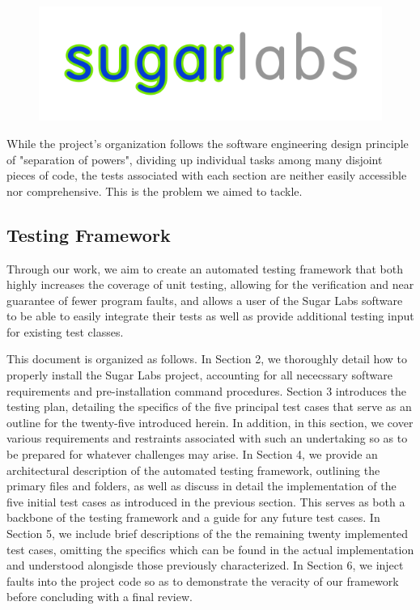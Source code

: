 \documentclass{article}
\begin{document}
\begin{figure}
\centering
\includegraphics[scale=0.5]{../imgs/Figure4.png}
\end{figure}

While the project's organization follows the software engineering design principle of "separation of powers", dividing up individual tasks among many disjoint pieces of code, the tests associated with each section are neither easily accessible nor comprehensive. This is the problem we aimed to tackle.
\subsection{Testing Framework}
Through our work, we aim to create an automated testing framework that both highly increases the coverage of unit testing, allowing for the verification and near guarantee of fewer program faults, and allows a user of the Sugar Labs software to be able to easily integrate their tests as well as provide additional testing input for existing test classes.

This document is organized as follows. In Section 2, we thoroughly detail how to properly install the Sugar Labs project, accounting for all nececssary software requirements and pre-installation command procedures. Section 3 introduces the testing plan, detailing the specifics of the five principal test cases that serve as an outline for the twenty-five introduced herein. In addition, in this section, we cover various requirements and restraints associated with such an undertaking so as to be prepared for whatever challenges may arise. In Section 4, we provide an architectural description of the automated testing framework, outlining the primary files and folders, as well as discuss in detail the implementation of the five initial test cases as introduced in the previous section. This serves as both a backbone of the testing framework and a guide for any future test cases. In Section 5, we include brief descriptions of the the remaining twenty implemented test cases, omitting the specifics which can be found in the actual implementation and understood alongisde those previously characterized. In Section 6, we inject faults into the project code so as to demonstrate the veracity of our framework before concluding with a final review.
\end{document}
